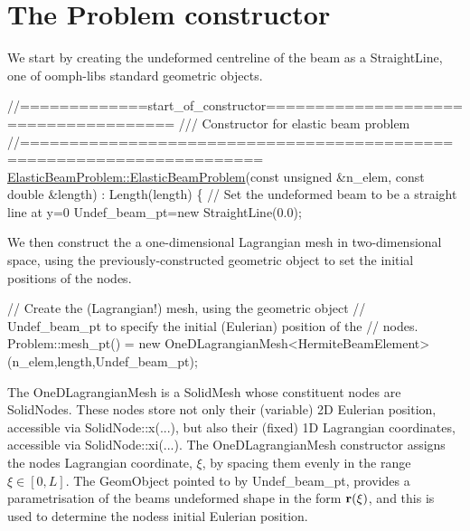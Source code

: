  

\hypertarget{index_constructor}{}\section{The Problem constructor}\label{index_constructor}
We start by creating the undeformed centreline of the beam as a {\ttfamily Straight\+Line}, one of {\ttfamily oomph-\/lib\textquotesingle{}s} standard geometric objects.


\begin{DoxyCodeInclude}
\textcolor{comment}{//=============start\_of\_constructor=====================================}
\textcolor{comment}{/// Constructor for elastic beam problem}
\textcolor{comment}{}\textcolor{comment}{//======================================================================}
\hyperlink{classElasticBeamProblem_a1c62c2a14c9a5528a649700d16dac2ea}{ElasticBeamProblem::ElasticBeamProblem}(\textcolor{keyword}{const} \textcolor{keywordtype}{unsigned} &n\_elem,
                                       \textcolor{keyword}{const} \textcolor{keywordtype}{double} &length) : Length(length)
\{
 \textcolor{comment}{// Set the undeformed beam to be a straight line at y=0}
 Undef\_beam\_pt=\textcolor{keyword}{new} StraightLine(0.0); 

\end{DoxyCodeInclude}


We then construct the a one-\/dimensional Lagrangian mesh in two-\/dimensional space, using the previously-\/constructed geometric object to set the initial positions of the nodes.


\begin{DoxyCodeInclude}
 \textcolor{comment}{// Create the (Lagrangian!) mesh, using the geometric object}
 \textcolor{comment}{// Undef\_beam\_pt to specify the initial (Eulerian) position of the}
 \textcolor{comment}{// nodes.}
 Problem::mesh\_pt() = 
  \textcolor{keyword}{new} OneDLagrangianMesh<HermiteBeamElement>(n\_elem,length,Undef\_beam\_pt);

\end{DoxyCodeInclude}


The {\ttfamily One\+D\+Lagrangian\+Mesh} is a {\ttfamily Solid\+Mesh} whose constituent nodes are {\ttfamily Solid\+Nodes}. These nodes store not only their (variable) 2D Eulerian position, accessible via {\ttfamily Solid\+Node\+::x}(...), but also their (fixed) 1D Lagrangian coordinates, accessible via {\ttfamily Solid\+Node\+::xi}(...). The {\ttfamily One\+D\+Lagrangian\+Mesh} constructor assigns the nodes\textquotesingle{} Lagrangian coordinate, $ \xi $, by spacing them evenly in the range $ \xi \in [0,L] $. The {\ttfamily Geom\+Object} pointed to by {\ttfamily Undef\+\_\+beam\+\_\+pt}, provides a parametrisation of the beam\textquotesingle{}s undeformed shape in the form $ {\bf r}(\xi) $, and this is used to determine the nodes\textquotesingle{}s initial Eulerian position.

